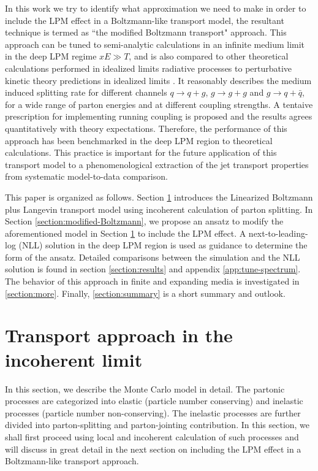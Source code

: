 \documentclass[aps, prc, reprint, amsmath, groupedaddress, nofootinbib]{revtex4-1}
\begin{document}
In this work we try to identify what approximation we need to make in order to include the LPM effect in a Boltzmann-like transport model, the resultant technique is termed as ``the modified Boltzmann transport" approach. 
This approach can be tuned to semi-analytic calculations in an infinite medium limit in the deep LPM regime $xE \gg T$, and is also compared to other theoretical calculations performed in idealized limits 
 radiative processes to perturbative kinetic theory predictions in idealized limits \cite{Arnold:2002zm,Arnold:2008zu,Arnold:2009mr,Baier:1996kr,Baier:1998yf}. 
It reasonably describes the medium induced splitting rate for different channels $q\rightarrow q+g$, $g\rightarrow g+g$ and $g\rightarrow q+\bar{q}$, for a wide range of parton energies and at different coupling strengths.
A tentaive prescription for implementing running coupling is proposed and the results agrees quantitatively with theory expectations.
Therefore, the performance of this approach has been benchmarked in the deep LPM region to theoretical calculations. 
This practice is important for the future application of this transport model to a phenomenological extraction of the jet transport properties from systematic model-to-data comparison.

This paper is organized as follows. Section \ref{section:Boltzmann} introduces the Linearized Boltzmann plus Langevin transport model using incoherent calculation of parton splitting.
In Section \ref{section:modified-Boltzmann}, we propose an ansatz to modify the aforementioned model in Section \ref{section:Boltzmann} to include the LPM effect.
A next-to-leading-log (NLL) solution in the deep LPM region is used as guidance to determine the form of the ansatz.
Detailed comparisons between the simulation and the NLL solution is found in section \ref{section:results} and appendix \ref{app:tune-spectrum}.
The behavior of this approach in finite and expanding media is investigated in \ref{section:more}.
Finally, \ref{section:summary} is a short summary and outlook.



\section{Transport approach in the incoherent limit}\label{section:Boltzmann}
In this section, we describe the Monte Carlo model in detail. The partonic processes are categorized into elastic (particle number conserving) and inelastic processes (particle number non-conserving). 
The inelastic processes are further divided into parton-splitting and parton-jointing contribution. 
In this section, we shall first proceed using local and incoherent calculation of such processes and will discuss in great detail in the next section on including the LPM effect in a Boltzmann-like transport approach.
\end{document}

